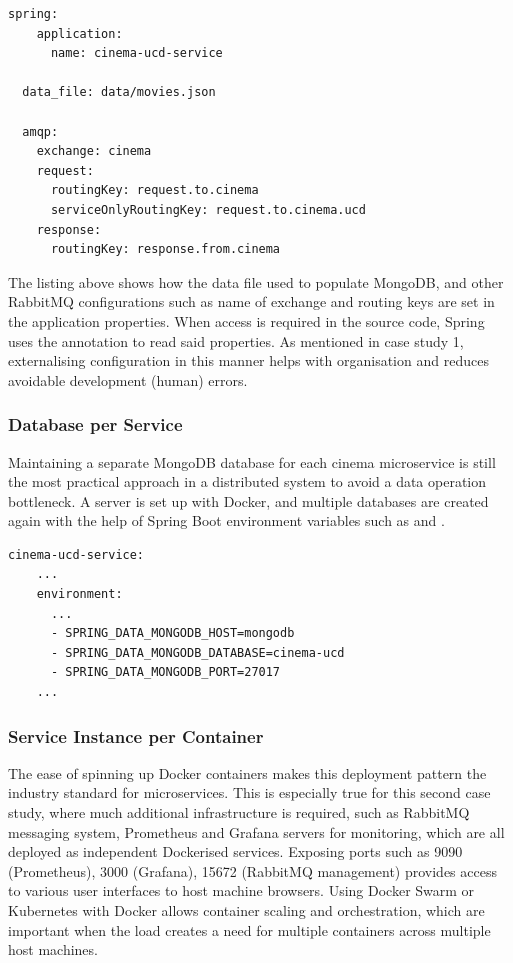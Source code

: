 \begin{lstlisting}[caption=UCD cinema's \code{application.yml}]
  spring:
    application:
      name: cinema-ucd-service

  data_file: data/movies.json

  amqp:
    exchange: cinema
    request:
      routingKey: request.to.cinema
      serviceOnlyRoutingKey: request.to.cinema.ucd
    response:
      routingKey: response.from.cinema
\end{lstlisting}

The listing above shows how the data file used to populate MongoDB, and other RabbitMQ configurations such as name of exchange and routing keys are set in the application properties. When access is required in the source code, Spring uses the  annotation to read said properties. As mentioned in case study 1, externalising configuration in this manner helps with organisation and reduces avoidable development (human) errors.

\subsubsection{Database per Service}

Maintaining a separate MongoDB database for each cinema microservice is still the most practical approach in a distributed system to avoid a data operation bottleneck. A server is set up with Docker, and multiple databases are created again with the help of Spring Boot environment variables such as  and .

\begin{lstlisting}[caption=Snippet from \code{docker-compose.yml} for UCD cinema]
  cinema-ucd-service:
    ...
    environment:
      ...
      - SPRING_DATA_MONGODB_HOST=mongodb
      - SPRING_DATA_MONGODB_DATABASE=cinema-ucd
      - SPRING_DATA_MONGODB_PORT=27017
    ...
\end{lstlisting}

\subsubsection{Service Instance per Container}

The ease of spinning up Docker containers makes this deployment pattern the industry standard for microservices. This is especially true for this second case study, where much additional infrastructure is required, such as RabbitMQ messaging system, Prometheus and Grafana servers for monitoring, which are all deployed as independent Dockerised services. Exposing ports such as 9090 (Prometheus), 3000 (Grafana), 15672 (RabbitMQ management) provides access to various user interfaces to host machine browsers. Using Docker Swarm or Kubernetes with Docker allows container scaling and orchestration, which are important when the load creates a need for multiple containers across multiple host machines.

